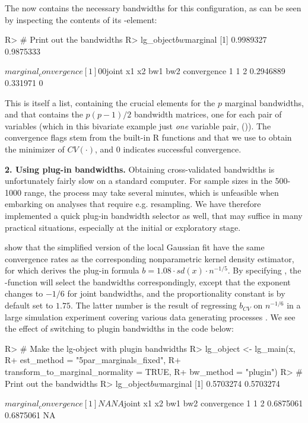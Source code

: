 The  now contains the necessary bandwidths for this configuration, as can be seen by inspecting the contents of its
-element:

\begin{example}
R> # Print out the bandwidths
R> lg_object$bw

$marginal
[1] 0.9989327 0.9875333

$marginal_convergence
[1] 0 0

$joint
x1 x2         bw1      bw2 convergence
1  1  2 0.2946889 0.331971           0
\end{example}
This is itself a list, containing the crucial elements  for the \(p\) marginal bandwidths, and  that contains the
\(p(p-1)/2\) bandwidth matrices, one for each pair of variables (which in this bivariate example just \emph{one} variable pair, ()). The convergence flags stem from the built-in R functions  and  that we use to obtain the minimizer of \(CV(\cdot)\), and 0 indicates successful convergence.

\textbf{2. Using plug-in bandwidths.} Obtaining cross-validated bandwidths is unfortunately fairly slow on a standard computer. For sample sizes in the 500-1000 range, the process may take several minutes, which is unfeasible when embarking on analyses that require e.g. resampling. We have therefore implemented a quick plug-in bandwidth selector as well, that may suffice in many practical situations, especially at the initial or exploratory stage. 

\citet{otne:tjos:2017} show that the simplified version of the local Gaussian fit have the same convergence rates as the corresponding nonparametric kernel density estimator, for which \citet{silv:1986} derives the plug-in formula \(b = 1.08\cdot sd(x) \cdot n^{-1/5}\). By
specifying , the -function will select the bandwidths correspondingly, except that the exponent changes to \(-1/6\) for joint bandwidths, and the proportionality constant is by default set to \(1.75\). The latter number is the result of regressing \(b_{CV}\) on \(n^{-1/6}\) in a large simulation experiment covering various data generating processes \citep{otneim2016multivariate}. We see
the effect of switching to plugin bandwidths in the code below: 

\begin{example}
R> # Make the lg-object with plugin bandwidths
R> lg_object <- lg_main(x,
R+                      est_method = "5par_marginals_fixed",
R+                      transform_to_marginal_normality = TRUE,
R+                      bw_method = "plugin")
R> # Print out the bandwidths
R> lg_object$bw

$marginal
[1] 0.5703274 0.5703274

$marginal_convergence
[1] NA NA

$joint
  x1 x2       bw1       bw2 convergence
1  1  2 0.6875061 0.6875061          NA
\end{example}


